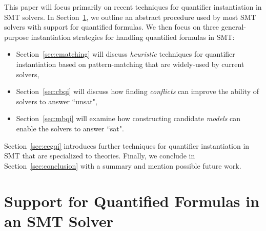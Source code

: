\documentclass[oribibl]{llncs}
\begin{document}
This paper will focus primarily on recent techniques for quantifier instantiation in SMT solvers.
In Section~\ref{sec:quant}, we outline an abstract procedure used by most SMT solvers with support for quantified formulas.
We then focus on three general-purpose instantiation strategies for handling quantified formulas in SMT:
\begin{itemize}
\item Section~\ref{sec:ematching} will discuss \emph{heuristic} techniques for quantifier instantiation based on pattern-matching that
are widely-used by current solvers,
\item Section~\ref{sec:cbqi} will discuss how finding \emph{conflicts} can improve the ability of solvers to answer ``unsat",
\item Section~\ref{sec:mbqi} will examine how constructing candidate \emph{models} can enable the solvers to answer ``sat".
\end{itemize} 
Section~\ref{sec:cegqi} introduces further techniques for quantifier instantiation in SMT that 
are specialized to theories.
Finally, we conclude in Section~\ref{sec:conclusion} with a summary and mention possible future work.

\section{Support for Quantified Formulas in an SMT Solver}
\label{sec:quant}
\end{document}
